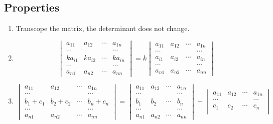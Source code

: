\documentclass{article}
\theoremstyle{definition}
\begin{document}
\subsection{Properties}
\begin{enumerate}
    \item Transcope the matrix, the determinant does not change.
    \item 
    $$\begin{vmatrix}
        a_{11} & a_{12} & \cdots & a_{1n}\\
        \cdots &  &  & \cdots\\
        ka_{i1} & ka_{i2} & \cdots & ka_{in}\\
        \cdots &  &  & \cdots\\
        a_{n1} & a_{n2} & \cdots & a_{nn}
        \end{vmatrix}
    = k\begin{vmatrix}
        a_{11} & a_{12} & \cdots & a_{1n}\\
        \cdots &  &  & \cdots\\
        a_{i1} & a_{i2} & \cdots & a_{in}\\
        \cdots &  &  & \cdots\\
        a_{n1} & a_{n2} & \cdots & a_{nn}
        \end{vmatrix}$$
    \item 
    $$\begin{vmatrix}
        a_{11} & a_{12} & \cdots & a_{1n}\\
        \cdots &  &  & \cdots\\
        b_{1}+c_{1} & b_{2}+c_{2} & \cdots & b_{n}+c_{n}\\
        \cdots &  &  & \cdots\\
        a_{n1} & a_{n2} & \cdots & a_{nn}
    \end{vmatrix}
    =
    \begin{vmatrix}
        a_{11} & a_{12} & \cdots & a_{1n}\\
        \cdots &  &  & \cdots\\
        b_{1} & b_{2} & \cdots & b_{n}\\
        \cdots &  &  & \cdots\\
        a_{n1} & a_{n2} & \cdots & a_{nn}
    \end{vmatrix}
    +
    \begin{vmatrix}
        a_{11} & a_{12} & \cdots & a_{1n}\\
        \cdots &  &  & \cdots\\
        c_{1} & c_{2} & \cdots & c_{n}\\

\end{vmatrix}$$
\end{enumerate}
\end{document}
